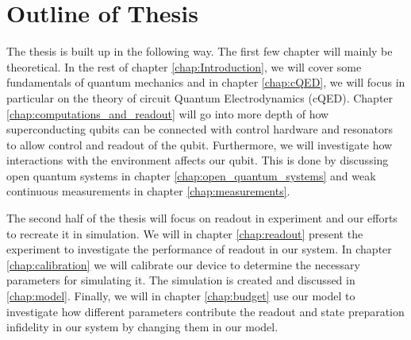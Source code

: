 


\section{Outline of Thesis}
The thesis is built up in the following way. The first few chapter will mainly be theoretical. In the rest of chapter \ref{chap:Introduction}, we will cover some fundamentals of quantum mechanics and in chapter \ref{chap:cQED}, we will focus in particular on the theory of circuit Quantum Electrodynamics (cQED). Chapter \ref{chap:computations_and_readout} will go into more depth of how superconducting qubits can be connected with control hardware and resonators to allow control and readout of the qubit. Furthermore, we will investigate how interactions with the environment affects our qubit. This is done by discussing open quantum systems in chapter \ref{chap:open_quantum_systems} and weak continuous measurements in chapter \ref{chap:measurements}.

The second half of the thesis will focus on readout in experiment and our efforts to recreate it in simulation. We will in chapter \ref{chap:readout} present the experiment to investigate the performance of readout in our system. In chapter \ref{chap:calibration} we will calibrate our device to determine the necessary parameters for simulating it. The simulation is created and discussed in \ref{chap:model}. Finally, we will in chapter \ref{chap:budget} use our model to investigate how different parameters contribute the readout and state preparation infidelity in our system by changing them in our model.  




